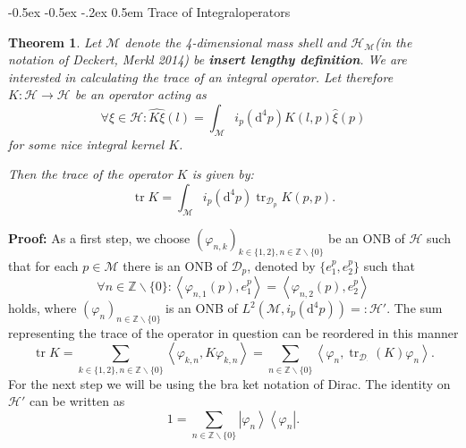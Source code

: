 \documentclass[oneside,reqno,12pt]{amsart}
\makeatletter
\newtheorem{Thm}[Def]{Theorem}
\DeclareMathOperator{\tr}{tr}
\renewcommand\subsection{\@startsection {subsection}{1}{\z@}%
                                   {-0.5ex \@plus -0.5ex \@minus -.2ex}%
                                   {0.5em}%
                                   {\normalfont\bfseries}}
\makeatother
\begin{document}
\subsection{Trace of Integraloperators}
\begin{Thm}\label{trace_int_op}
 Let \(\mathcal{M}\) denote the 4-dimensional mass shell and \(\mathcal{H}_{\mathcal{M}}\)(in the notation of Deckert, Merkl 2014) be {\bf insert lengthy definition}. We are interested in calculating the trace of an integral operator. Let therefore \(K: \mathcal{H}\rightarrow \mathcal{H}\) be an operator acting as
\begin{equation}
\forall  \xi  \in \mathcal{H}: \widehat{K\xi} (l)= \int_{\mathcal{M}} i_p \left( \mathrm{d}^4 p \right) K(l,p) \hat{\xi}(p)
\end{equation}
 for some nice integral kernel \(K\). 
 
 Then the trace of the operator \(K\) is given by:
 \begin{equation}
 \tr K= \int_{\mathcal{M}} i_p \left( \mathrm{d}^4 p \right) \tr_{\mathcal{D}_p} K(p,p).
 \end{equation}
 \end{Thm}
 {\bf Proof:} As a first step, we choose \((\varphi_{n,k})_{k\in \{1,2\} ,n\in \mathbb{Z}\backslash\{0\}}\) be an ONB of \(\mathcal{H}\) such that for each \(p\in \mathcal{M}\) there is an ONB of \(\mathcal{D}_p\), denoted by \(\{e^p_1,e^p_2\}\) such that
 \begin{equation*}
\forall n \in \mathbb{Z}\backslash\{0\}: \left<\varphi_{n,1}(p), e^p_1\right>=\left<\varphi_{n,2}(p), e^p_2\right>
 \end{equation*}
holds, where \((\varphi_n)_{n\in\mathbb{Z}\backslash\{0\}}\) is an ONB of \(L^2\left(\mathcal{M}, i_p\left(\mathrm{d}^4p\right)\right)=:\mathcal{H}'\). The sum representing the trace of the operator in question can be reordered in this manner
 \begin{equation*}
 \tr K = \sum_{k\in \{1,2\}, n \in \mathbb{Z}\backslash\{0\}} \left< \varphi_{k,n},K \varphi_{k,n}\right>=\sum_{n\in\mathbb{Z}\backslash \{0\}} \left< \varphi_{n},\tr_{\mathcal{D}_{\cdot}} \left(K\right) \varphi_{n}\right>
 .\end{equation*}
For the next step we will be using the bra ket notation of Dirac. The identity on \(\mathcal{H}'\) can be written as 
\begin{equation*}
1=\sum_{n\in\mathbb{Z}\backslash\{0\}} \left| \varphi_n \right> \left< \varphi_n \right|
.\end{equation*}
\end{document}
